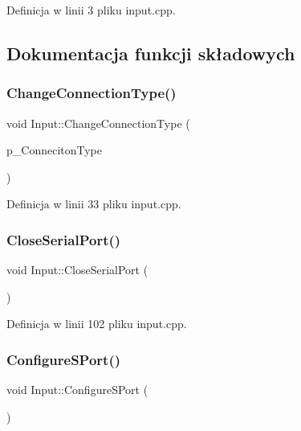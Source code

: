 Definicja w linii 3 pliku input.\+cpp.



\subsection{Dokumentacja funkcji składowych}
\mbox{\label{class_input_a76cacaeadb1ceed7f3f9585220e906c8}} 
\subsubsection{\texorpdfstring{Change\+Connection\+Type()}{ChangeConnectionType()}}
{\footnotesize\ttfamily void Input\+::\+Change\+Connection\+Type (\begin{DoxyParamCaption}\item[{\hyperlink{class_input_a3be20be9b454515798ecd3370f4e36fd}{Input\+::\+Connection\+Type\+\_\+t}}]{p\+\_\+\+Conneciton\+Type }\end{DoxyParamCaption})}



Definicja w linii 33 pliku input.\+cpp.

\mbox{\label{class_input_af60c2b300eadd2a25f47bb0c38c8bb2e}} 
\subsubsection{\texorpdfstring{Close\+Serial\+Port()}{CloseSerialPort()}}
{\footnotesize\ttfamily void Input\+::\+Close\+Serial\+Port (\begin{DoxyParamCaption}{ }\end{DoxyParamCaption})}



Definicja w linii 102 pliku input.\+cpp.

\mbox{\label{class_input_a1910fc2fed3b2f7055fa17f85529cce7}} 
\subsubsection{\texorpdfstring{Configure\+S\+Port()}{ConfigureSPort()}}
{\footnotesize\ttfamily void Input\+::\+Configure\+S\+Port (\begin{DoxyParamCaption}{ }\end{DoxyParamCaption})\hspace{0.3cm}{\ttfamily [private]}}




